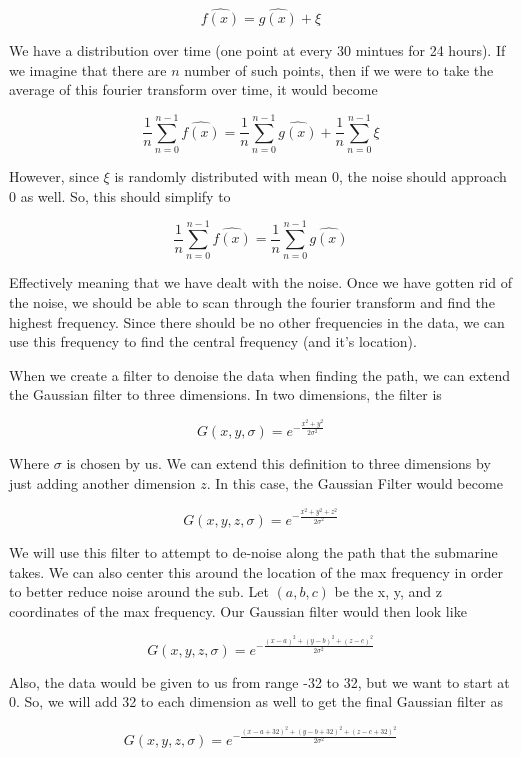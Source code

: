 \documentclass[11pt]{amsart}
\begin{document}
\[\hat{f(x)} = \hat{g(x)} + \xi\]

We have a distribution over time (one point at every 30 mintues for 24 hours). If we imagine that there are
$n$ number of such points, then if we were to take the average of this fourier transform over time, it
would become 

\[\frac{1}{n}\sum_{n=0}^{n-1}\hat{f(x)} = \frac{1}{n}\sum_{n=0}^{n-1}\hat{g(x)} + \frac{1}{n}\sum_{n=0}^{n-1}\xi\]

However, since $\xi$ is randomly distributed with mean 0, the noise should approach 0 as well. So,
this should simplify to 

\[\frac{1}{n}\sum_{n=0}^{n-1}\hat{f(x)} = \frac{1}{n}\sum_{n=0}^{n-1}\hat{g(x)}\]

Effectively meaning that we have dealt with the noise.
Once we have gotten rid of the noise, we should be able to scan through the fourier transform 
and find the highest frequency. Since there should be no other frequencies in the data, we can 
use this frequency to find the central frequency (and it's location). 

When we create a filter to denoise the data when finding the path, we can extend the Gaussian filter
to three dimensions. In two dimensions, the filter is 

\[G(x, y, \sigma) = e^{-\frac{x^2 + y^2}{2\sigma^2}}\]

Where $\sigma$ is chosen by us. We can extend this definition to three dimensions by just adding another
dimension $z$. In this case, the Gaussian Filter would become 

\[G(x, y, z, \sigma) = e^{-\frac{x^2 + y^2 + z^2}{2\sigma^2}}\]

We will use this filter to attempt to de-noise along the path that the submarine takes. We can also center 
this around the location of the max frequency in order to better reduce noise around the sub. Let $(a, b, c)$
be the x, y, and z coordinates of the max frequency. Our Gaussian filter would then look like 

\[G(x, y, z, \sigma) = e^{-\frac{(x - a)^2 + (y - b)^2 + (z - c)^2}{2\sigma^2}}\]

Also, the data would be given to us from range -32 to 32, but we want to start at 0. So, we will add 
32 to each dimension as well to get the final Gaussian filter as 

\[G(x, y, z, \sigma) = e^{-\frac{(x - a + 32)^2 + (y - b + 32)^2 + (z - c + 32)^2}{2\sigma^2}}\]
\end{document}
